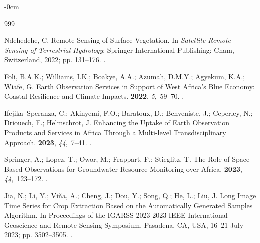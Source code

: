\documentclass[jimaging,article,accept,pdftex,moreauthors]{Definitions/mdpi}
\begin{document}
\begin{adjustwidth}{-\extralength}{0cm}


\begin{thebibliography}{999}

Ndehedehe, C. Remote Sensing of Surface Vegetation.
\newblock In {\em Satellite Remote Sensing of Terrestrial Hydrology}; Springer
  International Publishing: Cham, Switzerland, %
 2022; pp. 131--176.
.

Foli, B.A.K.; Williams, I.K.; Boakye, A.A.; Azumah, D.M.Y.; Agyekum, K.A.;
  Wiafe, G.
\newblock Earth Observation Services in Support of West Africa's Blue Economy:
  Coastal Resilience and Climate Impacts.
 {\bf 2022}, {\em
  5},~59--70.
.

Ifejika~Speranza, C.; Akinyemi, F.O.; Baratoux, D.; Benveniste, J.; Ceperley,
  N.; Driouech, F.; Helmschrot, J.
\newblock Enhancing the Uptake of Earth Observation Products and Services in
  Africa Through a Multi-level Transdisciplinary Approach.
 {\bf 2023}, {\em 44},~7--41.
.

Springer, A.; Lopez, T.; Owor, M.; Frappart, F.; Stieglitz, T.
\newblock The Role of Space-Based Observations for Groundwater Resource
  Monitoring over Africa.
 {\bf 2023}, {\em 44},~123--172.
.

Jia, N.; Li, Y.; Viña, A.; Cheng, J.; Dou, Y.; Song, Q.; He, L.; Liu, J.
\newblock Long Image Time Series for Crop Extraction Based on the Automatically
  Generated Samples Algorithm.
\newblock In Proceedings of the IGARSS 2023-2023 IEEE International
  Geoscience and Remote Sensing Symposium,  Pasadena, CA, USA, 16--21 July 2023;  pp. 3502--3505.
.


\end{thebibliography}
\end{adjustwidth}
\end{document}
